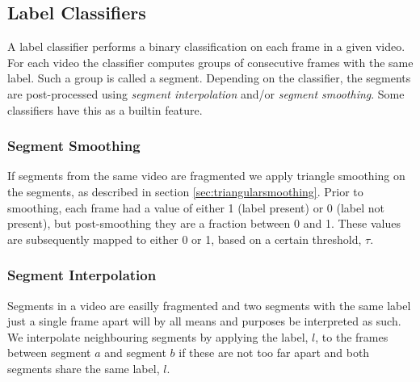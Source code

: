 \subsection{Label Classifiers}
%
A label classifier performs a binary classification on each frame in a given video. For each video the classifier computes groups of consecutive frames with the same label. Such a group is called a segment. Depending on the classifier, the segments are post-processed using \textit{segment interpolation} and/or \textit{segment smoothing}. Some classifiers have this as a builtin feature.
%
\subsubsection{Segment Smoothing}\label{sec:labelsmooth}
%
If segments from the same video are fragmented we apply triangle smoothing on the segments, as described in section \ref{sec:triangularsmoothing}. Prior to smoothing, each frame had a value of either 1 (label present) or 0 (label not present), but post-smoothing they are a fraction between 0 and 1. These values are subsequently mapped to either 0 or 1, based on a certain threshold, $\tau$.
%
\subsubsection{Segment Interpolation}\label{sec:labelmerge}
%
Segments in a video are easilly fragmented and two segments with the same label just a single frame apart will by all means and purposes be interpreted as such. We interpolate neighbouring segments by applying the label, $l$, to the frames between segment $a$ and segment $b$ if these are not too far apart and both segments share the same label, $l$.
%
